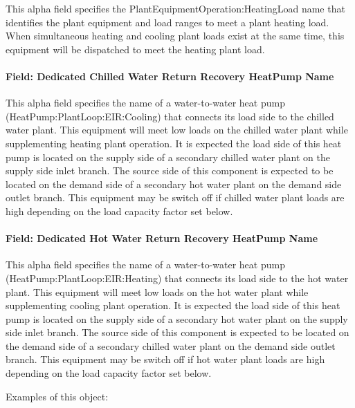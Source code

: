 This alpha field specifies the PlantEquipmentOperation:HeatingLoad name that identifies the plant equipment and load ranges to meet a plant heating load. When simultaneous heating and cooling plant loads exist at the same time, this equipment will be dispatched to meet the heating plant load.

\paragraph{Field: Dedicated Chilled Water Return Recovery HeatPump Name}\label{field-dedicated-chilled-return-recovery-hp-name-plantequipmentoperationchillerheaterchangeover}

This alpha field specifies the name of a water-to-water heat pump (HeatPump:PlantLoop:EIR:Cooling) that connects its load side to the chilled water plant. This equipment will meet low loads on the chilled water plant while supplementing heating plant operation. It is expected the load side of this heat pump is located on the supply side of a secondary chilled water plant on the supply side inlet branch. The source side of this component is expected to be located on the demand side of a secondary hot water plant on the demand side outlet branch. This equipment may be switch off if chilled water plant loads are high depending on the load capacity factor set below.

\paragraph{Field: Dedicated Hot Water Return Recovery HeatPump Name}\label{field-dedicated-hot-return-recovery-hp-name-plantequipmentoperationchillerheaterchangeover}

This alpha field specifies the name of a water-to-water heat pump (HeatPump:PlantLoop:EIR:Heating) that connects its load side to the hot water plant. This equipment will meet low loads on the hot water plant while supplementing cooling plant operation. It is expected the load side of this heat pump is located on the supply side of a secondary hot water plant on the supply side inlet branch. The source side of this component is expected to be located on the demand side of a secondary chilled water plant on the demand side outlet branch. This equipment may be switch off if hot water plant loads are high depending on the load capacity factor set below.

Examples of this object:

